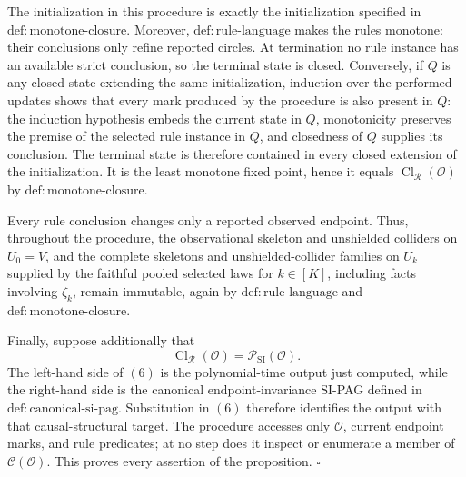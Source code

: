 The initialization in this procedure is exactly the initialization specified in \(\mathrm{def:monotone\mbox{-}closure}\).  Moreover, \(\mathrm{def:rule\mbox{-}language}\) makes the rules monotone: their conclusions only refine reported circles.  At termination no rule instance has an available strict conclusion, so the terminal state is closed.  Conversely, if \(Q\) is any closed state extending the same initialization, induction over the performed updates shows that every mark produced by the procedure is also present in \(Q\): the induction hypothesis embeds the current state in \(Q\), monotonicity preserves the premise of the selected rule instance in \(Q\), and closedness of \(Q\) supplies its conclusion.  The terminal state is therefore contained in every closed extension of the initialization.  It is the least monotone fixed point, hence it equals \(\operatorname{Cl}_{\mathcal R}(\mathcal O)\) by \(\mathrm{def:monotone\mbox{-}closure}\).

Every rule conclusion changes only a reported observed endpoint.  Thus, throughout the procedure, the observational skeleton and unshielded colliders on \(U_0=V\), and the complete skeletons and unshielded-collider families on \(U_k\) supplied by the faithful pooled selected laws for \(k\in[K]\), including facts involving \(\zeta_k\), remain immutable, again by \(\mathrm{def:rule\mbox{-}language}\) and \(\mathrm{def:monotone\mbox{-}closure}\).

Finally, suppose additionally that
\[
\operatorname{Cl}_{\mathcal R}(\mathcal O)
=\mathcal P_{\mathrm{SI}}(\mathcal O).
\tag{6}
\]
The left-hand side of \((6)\) is the polynomial-time output just computed, while the right-hand side is the canonical endpoint-invariance SI-PAG defined in \(\mathrm{def:canonical\mbox{-}si\mbox{-}pag}\).  Substitution in \((6)\) therefore identifies the output with that causal-structural target.  The procedure accesses only \(\mathcal O\), current endpoint marks, and rule predicates; at no step does it inspect or enumerate a member of \(\mathcal C(\mathcal O)\).  This proves every assertion of the proposition. \(\square\)
